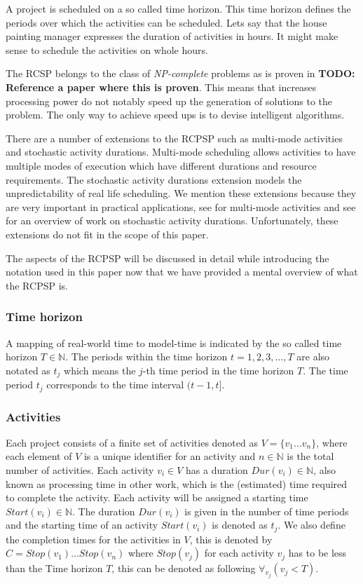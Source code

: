 \documentclass{article}
\newcommand{\TODO}[1]{{\color{red}\textbf{TODO: #1}}}
\newcommand{\dur}[1]{\textit{Dur}(#1)} %
\newcommand{\start}[1]{\textit{Start}(#1)} %
\begin{document}
A project is scheduled on a so called time horizon. This time horizon defines the periods over which the activities can be scheduled. Lets say that the house painting manager expresses the duration of activities in hours. It might make sense to schedule the activities on whole hours. 

The RCSP belongs to the class of \emph{NP-complete} problems as is proven in \TODO{Reference a paper where this is proven}. This means that increases processing power do not notably speed up the generation of solutions to the problem. The only way to achieve speed ups is to devise intelligent algorithms. 

There are a number of extensions to the RCPSP such as multi-mode activities and stochastic activity durations. Multi-mode scheduling allows activities to have multiple modes of execution which have different durations and resource requirements. The stochastic activity durations extension models the unpredictability of real life scheduling. We mention these extensions because they are very important in practical applications, see \citet{deblaere10} for multi-mode activities and see \citet{brucker99} for an overview of work on stochastic activity durations. Unfortunately, these extensions do not fit in the scope of this paper. 

The aspects of the RCPSP will be discussed in detail while introducing the notation used in this paper now that we have provided a mental overview of what the RCPSP is. 

\subsubsection{Time horizon}
A mapping of real-world time to model-time is indicated by the so called time horizon $T \in \mathbb{N}$. 
The periods within the time horizon $t=1,2,3,\ldots,T$ are also notated as $t_j$ which means the $j$-th time period in the time horizon $T$. 
The time period $t_j$ corresponds to the time interval $(t-1,t]$. 

\subsubsection{Activities}
Each project consists of a finite set of activities denoted as $V = \{v_1 \ldots v_n\}$, where each element of $V$ is a unique identifier for an activity and $n \in \mathbb{N}$ is the total number of activities.
Each activity $v_i \in V$ has a duration $\dur{v_i} \in \mathbb{N}$, also known as processing time in other work, which is the (estimated) time required to complete the activity. 
Each activity will be assigned a starting time $\start{v_i} \in \mathbb{N}$. 
The duration $\dur{v_i}$ is given in the number of time periods and the starting time of an activity $\start{v_i}$ is denoted as $t_j$. 
We also define the completion times for the activities in $V$, this is denoted by $C = Stop(v_1) \ldots Stop(v_n)$ where $Stop(v_j)$ for each activity $v_j$ has to be less than the Time horizon $T$, this can be denoted as following $\forall_{v_j}(v_j < T)$.
\end{document}
